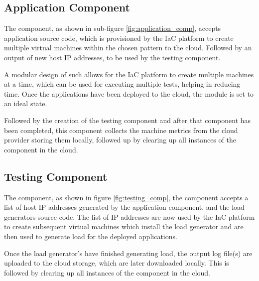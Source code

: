 \subsection{Application Component}

The component, as shown in sub-figure \ref{fig:application_comp}, accepts application source code, which is provisioned by the IaC platform to create multiple virtual machines within the chosen pattern to the cloud. Followed by an output of new host IP addresses, to be used by the testing component. 

A modular design of such allows for the IaC platform to create multiple machines at a time, which can be used for executing multiple tests, helping in reducing time. Once the applications have been deployed to the cloud, the module is set to an ideal state.

Followed by the creation of the testing component and after that component has been completed, this component collects the machine metrics from the cloud provider storing them locally, followed up by clearing up all instances of the component in the cloud. 
\subsection{Testing Component}
The component, as shown in figure \ref{fig:testing_comp}, the component accepts a list of host IP addresses generated by the application component, and the load generators source code. The list of IP addresses are now used by the IaC platform to create subsequent virtual machines which install the load generator and are then used to generate load for the deployed applications.

Once the load generator's have finished generating load, the output log file(s) are uploaded to the cloud storage, which are later downloaded locally. This is followed by clearing up all instances of the component in the cloud. 

